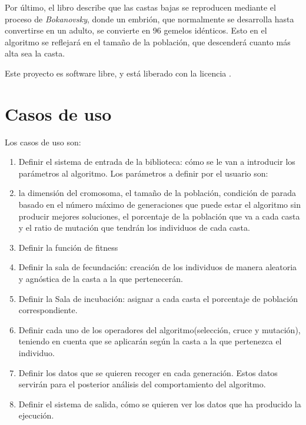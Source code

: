 Por último, el libro describe que las castas bajas se reproducen mediante el proceso de \textit{Bokanovsky}, donde un embrión, que normalmente se desarrolla hasta convertirse
en un adulto, se convierte en 96 gemelos idénticos. Esto en el algoritmo se reflejará en el tamaño de la población, que descenderá cuanto más alta sea la casta.


Este proyecto es software libre, y está liberado con la licencia \cite{gplv3}.

\section{Casos de uso}

Los casos de uso son:

\begin{enumerate}
    \item Definir el sistema de entrada de la biblioteca: cómo se le van a introducir los parámetros al algoritmo. Los parámetros a definir por el usuario son:
    \item la dimensión del cromosoma, el tamaño de la población, condición de parada basado en el número máximo de generaciones que puede estar el algoritmo
    sin producir mejores soluciones, el porcentaje de la población que va a cada casta y el ratio de mutación que tendrán los individuos de cada casta.
    \item Definir la función de fitness
    \item Definir la sala de fecundación: creación de los individuos de manera aleatoria y agnóstica de la casta a la que pertenecerán. 
    \item Definir la Sala de incubación: asignar a cada casta el porcentaje de población correspondiente.
    \item Definir cada uno de los operadores del algoritmo(selección, cruce y mutación), teniendo en cuenta que se aplicarán según la casta a la que pertenezca el individuo.
    \item Definir los datos que se quieren recoger en cada generación. Estos datos servirán para el posterior análisis del comportamiento del algoritmo.
    \item Definir el sistema de salida, cómo se quieren ver los datos que ha producido la ejecución.
\end{enumerate}